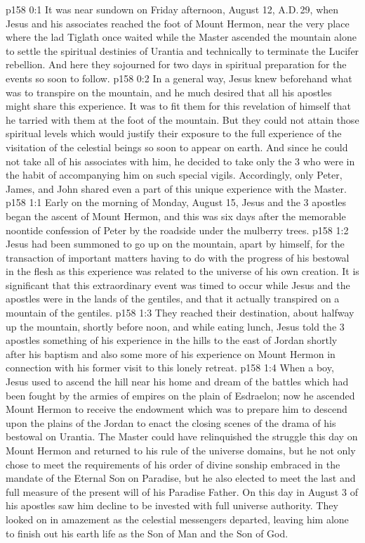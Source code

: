 \author{Midwayer Commission}
\vs p158 0:1 It was near sundown on Friday afternoon, August 12, A.D.\,29, when Jesus and his associates reached the foot of Mount Hermon, near the very place where the lad Tiglath once waited while the Master ascended the mountain alone to settle the spiritual destinies of Urantia and technically to terminate the Lucifer rebellion. And here they sojourned for two days in spiritual preparation for the events so soon to follow.
\vs p158 0:2 In a general way, Jesus knew beforehand what was to transpire on the mountain, and he much desired that all his apostles might share this experience. It was to fit them for this revelation of himself that he tarried with them at the foot of the mountain. But they could not attain those spiritual levels which would justify their exposure to the full experience of the visitation of the celestial beings so soon to appear on earth. And since he could not take all of his associates with him, he decided to take only the 3 who were in the habit of accompanying him on such special vigils. Accordingly, only Peter, James, and John shared even a part of this unique experience with the Master.
\vs p158 1:1 Early on the morning of Monday, August 15, Jesus and the 3 apostles began the ascent of Mount Hermon, and this was six days after the memorable noontide confession of Peter by the roadside under the mulberry trees.
\vs p158 1:2 Jesus had been summoned to go up on the mountain, apart by himself, for the transaction of important matters having to do with the progress of his bestowal in the flesh as this experience was related to the universe of his own creation. It is significant that this extraordinary event was timed to occur while Jesus and the apostles were in the lands of the gentiles, and that it actually transpired on a mountain of the gentiles.
\vs p158 1:3 They reached their destination, about halfway up the mountain, shortly before noon, and while eating lunch, Jesus told the 3 apostles something of his experience in the hills to the east of Jordan shortly after his baptism and also some more of his experience on Mount Hermon in connection with his former visit to this lonely retreat.
\vs p158 1:4 When a boy, Jesus used to ascend the hill near his home and dream of the battles which had been fought by the armies of empires on the plain of Esdraelon; now he ascended Mount Hermon to receive the endowment which was to prepare him to descend upon the plains of the Jordan to enact the closing scenes of the drama of his bestowal on Urantia. The Master could have relinquished the struggle this day on Mount Hermon and returned to his rule of the universe domains, but he not only chose to meet the requirements of his order of divine sonship embraced in the mandate of the Eternal Son on Paradise, but he also elected to meet the last and full measure of the present will of his Paradise Father. On this day in August 3 of his apostles saw him decline to be invested with full universe authority. They looked on in amazement as the celestial messengers departed, leaving him alone to finish out his earth life as the Son of Man and the Son of God.
